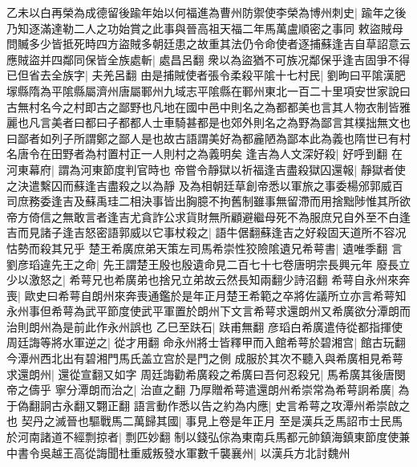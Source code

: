 乙未以白再榮為成德留後踰年始以何福進為曹州防禦使李榮為博州刺史|{
	踰年之後乃知逐滿達勒二人之功始賞之此事與晉高祖天福二年馬萬盧順密之事同}
敕盜賊母問贓多少皆抵死時四方盜賊多朝廷患之故重其法仍令命使者逐捕蘇逢吉自草詔意云應賊盜并四鄰同保皆全族處斬|{
	處昌呂翻}
衆以為盜猶不可族况鄰保乎逢吉固爭不得已但省去全族字|{
	夫羌呂翻}
由是捕賊使者張令柔殺平隂十七村民|{
	劉昫曰平隂漢肥塜縣隋為平隂縣屬濟州唐屬鄆州九域志平隂縣在鄆州東北一百二十里項安世家說曰古無村名今之村即古之鄙野也凡地在國中邑中則名之為都都美也言其人物衣制皆雅麗也凡言美者曰都曰子都都人士車騎甚都是也郊外則名之為野為鄙言其樸拙無文也曰鄙者如列子所謂鄭之鄙人是也故古語謂美好為都麄陋為鄙本此為義也隋世已有村名唐令在田野者為村置村正一人則村之為義明矣}
逢吉為人文深好殺|{
	好呼到翻}
在河東幕府|{
	謂為河東節度判官時也}
帝嘗令靜獄以祈福逢吉盡殺獄囚還報|{
	靜獄者使之決遣繫囚而蘇逢吉盡殺之以為靜}
及為相朝廷草創帝悉以軍旅之事委楊邠郭威百司庶務委逢吉及蘇禹珪二相決事皆出胸臆不拘舊制雖事無留滯而用捨黜陟惟其所欲帝方倚信之無敢言者逢吉尤貪詐公求貨財無所顧避繼母死不為服庶兄自外至不白逢吉而見諸子逢吉怒密語郭威以它事杖殺之|{
	語牛倨翻蘇逢吉之好殺固天道所不容况怙勢而殺其兄乎}
楚王希廣庶弟天策左司馬希崇性狡險隂遺兄希萼書|{
	遺唯季翻}
言劉彦瑫違先王之命|{
	先王謂楚王殷也殷遺命見二百七十七卷唐明宗長興元年}
廢長立少以激怒之|{
	希萼兄也希廣弟也捨兄立弟故云然長知兩翻少詩沼翻}
希萼自永州來奔喪|{
	歐史曰希萼自朗州來奔喪通鑑於是年正月楚王希範之卒將佐議所立亦言希萼知永州事但希萼為武平節度使武平軍置於朗州下文言希萼求還朗州又希廣欲分潭朗而治則朗州為是前此作永州誤也}
乙巳至趺石|{
	趺甫無翻}
彦瑫白希廣遣侍從都指揮使周廷誨等將水軍逆之|{
	從才用翻}
命永州將士皆釋甲而入館希萼於碧湘宫|{
	館古玩翻今潭州西北出有碧湘門馬氏盖立宫於是門之側}
成服於其次不聽入與希廣相見希萼求還朗州|{
	還從宣翻又如字}
周廷誨勸希廣殺之希廣曰吾何忍殺兄|{
	馬希廣其後唐閔帝之儔乎}
寧分潭朗而治之|{
	治直之翻}
乃厚贈希萼遣還朗州希崇常為希萼詗希廣|{
	為于偽翻詗古永翻又翾正翻}
語言動作悉以告之約為内應|{
	史言希萼之攻潭州希崇啟之也}
契丹之滅晉也驅戰馬二萬歸其國|{
	事見上卷是年正月}
至是漢兵乏馬詔市士民馬於河南諸道不經剽掠者|{
	剽匹妙翻}
制以錢弘倧為東南兵馬都元帥鎮海鎮東節度使兼中書令吳越王高從誨聞杜重威叛發水軍數千襲襄州|{
	以漢兵方北討魏州}


